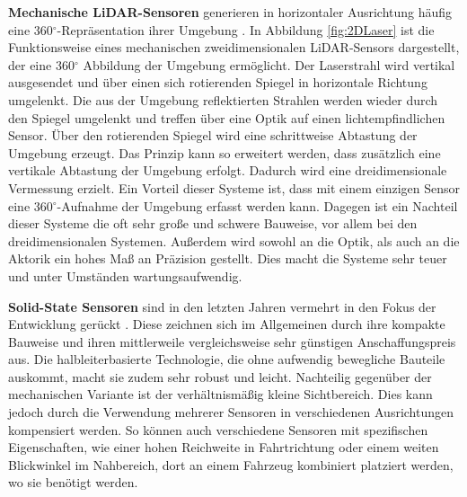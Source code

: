 \textbf{Mechanische LiDAR-Sensoren} generieren in horizontaler Ausrichtung häufig eine 360$^\circ$-Repräsentation ihrer Umgebung \cite{Weber2020}. In Abbildung \ref{fig:2DLaser} ist die Funk\-tions\-weise eines mechanischen zweidimensionalen LiDAR-Sensors dargestellt, der eine 360$^\circ$ Abbildung der Umgebung ermöglicht. Der Laserstrahl wird vertikal ausgesendet und über einen sich rotierenden Spiegel in horizontale Richtung umgelenkt. Die aus der Umgebung reflektierten Strahlen werden wieder durch den Spiegel umgelenkt und tref\-fen über eine Optik auf einen lichtempfindlichen Sensor. Über den rotierenden Spiegel wird eine schrittweise Abtastung der Umgebung erzeugt. Das Prinzip kann so er\-wei\-tert werden, dass zusätzlich eine vertikale Abtastung der Umgebung erfolgt. Dadurch wird eine dreidimensionale Vermessung erzielt. Ein Vorteil dieser Systeme ist, dass mit einem einzigen Sensor eine 360$^\circ$-Aufnahme der Umgebung erfasst werden kann. Dagegen ist ein Nachteil dieser Systeme die oft sehr große und schwere Bauweise, vor allem bei den dreidimensionalen Systemen. Außerdem wird sowohl an die Optik, als auch an die Aktorik  ein hohes Maß an Präzision gestellt. Dies macht die Systeme sehr teuer und unter Umständen wartungsaufwendig. 
 
\textbf{Solid-State Sensoren} sind in den letzten Jahren vermehrt in den Fokus der Ent\-wick\-lung gerückt \cite{FM2020}. Diese zeichnen sich im Allgemeinen durch ihre kompakte Bauweise und ihren mittlerweile vergleichsweise sehr günstigen Anschaffungspreis aus. Die halbleiterbasierte Technologie, die ohne aufwendig bewegliche Bauteile auskommt, macht sie zudem sehr robust und leicht. Nachteilig gegenüber der mechanischen Variante ist der verhältnismäßig kleine Sichtbereich. Dies kann jedoch durch die Verwendung mehrerer Sensoren in verschiedenen Ausrichtungen kompensiert werden. So können auch verschiedene Sensoren mit spezifischen Eigenschaften, wie einer hohen Reichweite in Fahrtrichtung oder einem weiten Blickwinkel im Nahbereich, dort an einem Fahrzeug kombiniert platziert werden, wo sie benötigt werden.

 
